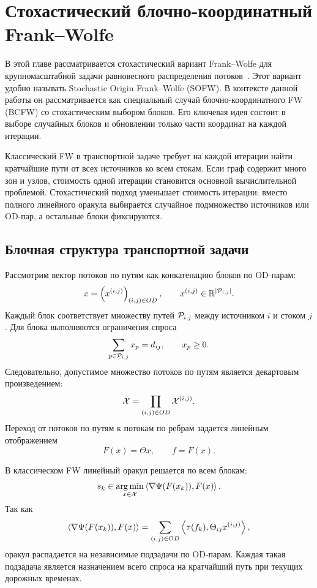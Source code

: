 \newpage

\section{Стохастический блочно-координатный Frank--Wolfe}
\label{sec:scfw}

В этой главе рассматривается стохастический вариант Frank--Wolfe для крупномасштабной задачи равновесного распределения потоков~\cite{ignashin2026stochastic}.
Этот вариант удобно называть Stochastic Origin Frank--Wolfe (SOFW).
В контексте данной работы он рассматривается как специальный случай блочно-координатного FW (BCFW) со стохастическим выбором блоков.
Его ключевая идея состоит в выборе случайных блоков и обновлении только части координат на каждой итерации.

Классический FW в транспортной задаче требует на каждой итерации найти кратчайшие пути от всех источников ко всем стокам.
Если граф содержит много зон и узлов, стоимость одной итерации становится основной вычислительной проблемой.
Стохастический подход уменьшает стоимость итерации: вместо полного линейного оракула выбирается случайное подмножество источников или OD-пар, а остальные блоки фиксируются.

\subsection{Блочная структура транспортной задачи}

Рассмотрим вектор потоков по путям как конкатенацию блоков по OD-парам:
\[
    x=
    \left(x^{(i,j)}\right)_{(i,j)\in OD},
    \qquad
    x^{(i,j)}\in\mathbb{R}^{|\mathcal{P}_{i,j}|}.
\]
Каждый блок соответствует множеству путей $\mathcal{P}_{i,j}$ между источником $i$ и стоком $j$.
Для блока выполняются ограничения спроса
\[
    \sum_{p\in\mathcal{P}_{i,j}}x_p=d_{ij},
    \qquad
    x_p\geq 0.
\]
Следовательно, допустимое множество потоков по путям является декартовым произведением:
\[
    \mathcal{X}=
    \prod_{(i,j)\in OD}\mathcal{X}^{(i,j)}.
\]
Переход от потоков по путям к потокам по ребрам задается линейным отображением
\[
    F(x)=\Theta x,
    \qquad
    f=F(x).
\]

В классическом FW линейный оракул решается по всем блокам:
\[
    s_k\in
    \operatorname*{arg\,min}_{x\in\mathcal{X}}
    \left\langle \nabla\Psi(F(x_k)), F(x) \right\rangle.
\]
Так как
\[
    \left\langle \nabla\Psi(F(x_k)), F(x) \right\rangle
    =
    \sum_{(i,j)\in OD}
    \left\langle \tau(f_k), \Theta_{ij}x^{(i,j)} \right\rangle,
\]
оракул распадается на независимые подзадачи по OD-парам.
Каждая такая подзадача является назначением всего спроса на кратчайший путь при текущих дорожных временах.

